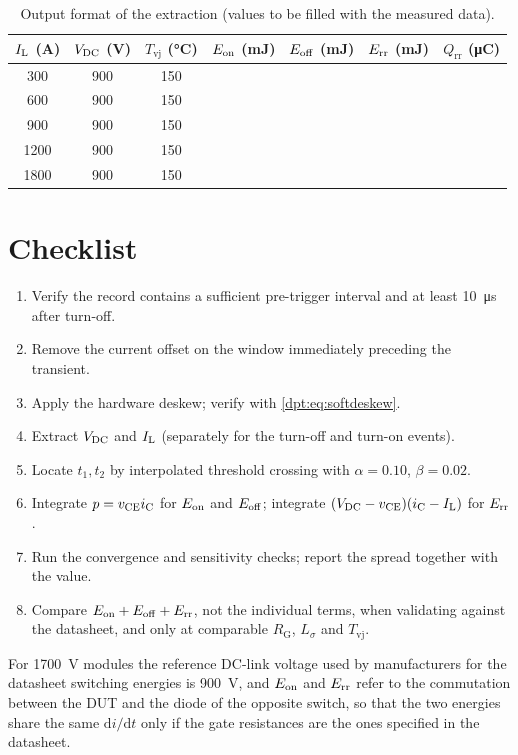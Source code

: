 \begin{table}[htbp]
\centering
\caption{Output format of the extraction (values to be filled with the measured data).}
\label{dpt:tab:out}
\begin{tabular}{ccccccc}
\toprule
$I_{\mathrm{L}}$ (\si{\ampere}) & $V_{\mathrm{DC}}$ (\si{\volt}) & $T_{\mathrm{vj}}$ (\si{\celsius}) &
$E_{\mathrm{on}}$ (\si{\milli\joule}) & $E_{\mathrm{off}}$ (\si{\milli\joule}) &
$E_{\mathrm{rr}}$ (\si{\milli\joule}) & $Q_{\mathrm{rr}}$ (\si{\micro\coulomb}) \\
\midrule
300  & 900 & 150 & & & & \\
600  & 900 & 150 & & & & \\
900  & 900 & 150 & & & & \\
1200 & 900 & 150 & & & & \\
1800 & 900 & 150 & & & & \\
\bottomrule
\end{tabular}
\end{table}

\section{Checklist}

\begin{enumerate}
\item Verify the record contains a sufficient pre-trigger interval and at least
\SI{10}{\micro\second} after turn-off.
\item Remove the current offset on the window immediately preceding the transient.
\item Apply the hardware deskew; verify with \eqref{dpt:eq:softdeskew}.
\item Extract $V_{\mathrm{DC}}$ and $I_{\mathrm{L}}$ (separately for the turn-off and turn-on events).
\item Locate $t_1,t_2$ by interpolated threshold crossing with $\alpha=0.10$,
$\beta=0.02$.
\item Integrate $p=v_{\mathrm{CE}}i_{\mathrm{C}}$ for $E_{\mathrm{on}}$ and $E_{\mathrm{off}}$; integrate
$(V_{\mathrm{DC}}-v_{\mathrm{CE}})(i_{\mathrm{C}}-I_{\mathrm{L}})$ for $E_{\mathrm{rr}}$.
\item Run the convergence and sensitivity checks; report the spread together with the
value.
\item Compare $E_{\mathrm{on}}+E_{\mathrm{off}}+E_{\mathrm{rr}}$, not the individual terms, when validating against the
datasheet, and only at comparable $R_{\mathrm{G}}$, $L_\sigma$ and $T_{\mathrm{vj}}$.
\end{enumerate}

For \SI{1700}{\volt} modules the reference DC-link voltage used by manufacturers for the
datasheet switching energies is \SI{900}{\volt}, and $E_{\mathrm{on}}$ and $E_{\mathrm{rr}}$ refer to the
commutation between the DUT and the diode of the opposite switch, so that the two
energies share the same $\mathrm{d}i/\mathrm{d}t$ only if the gate resistances are the
ones specified in the datasheet.

